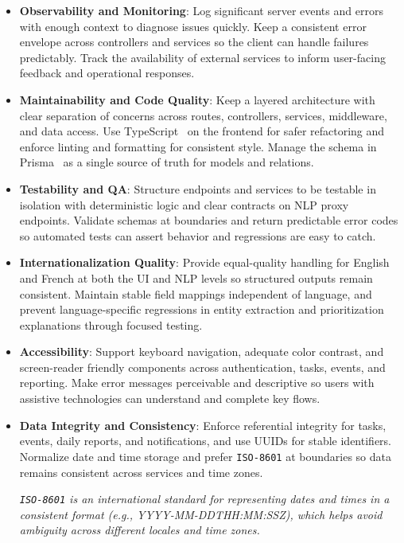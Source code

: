 \documentclass[12pt,a4paper]{article}
\begin{document}
\begin{itemize}
  \item \textbf{Observability and Monitoring}: Log significant server events and errors with enough context to diagnose issues quickly. Keep a consistent error envelope across controllers and services so the client can handle failures predictably. Track the availability of external services to inform user-facing feedback and operational responses.

  \item \textbf{Maintainability and Code Quality}: Keep a layered architecture with clear separation of concerns across routes, controllers, services, middleware, and data access. Use TypeScript~\cite{typescript} on the frontend for safer refactoring and enforce linting and formatting for consistent style. Manage the schema in Prisma~\cite{prisma} as a single source of truth for models and relations.

  \item \textbf{Testability and QA}: Structure endpoints and services to be testable in isolation with deterministic logic and clear contracts on NLP proxy endpoints. Validate schemas at boundaries and return predictable error codes so automated tests can assert behavior and regressions are easy to catch.

  \item \textbf{Internationalization Quality}: Provide equal-quality handling for English and French at both the UI and NLP levels so structured outputs remain consistent. Maintain stable field mappings independent of language, and prevent language-specific regressions in entity extraction and prioritization explanations through focused testing.

  \item \textbf{Accessibility}: Support keyboard navigation, adequate color contrast, and screen-reader friendly components across authentication, tasks, events, and reporting. Make error messages perceivable and descriptive so users with assistive technologies can understand and complete key flows.

  \item \textbf{Data Integrity and Consistency}: Enforce referential integrity for tasks, events, daily reports, and notifications, and use UUIDs for stable identifiers. Normalize date and time storage and prefer \texttt{ISO-8601} at boundaries so data remains consistent across services and time zones.
  \begin{center}
  \small\textit{\texttt{ISO-8601} is an international standard for representing dates and times in a consistent format (e.g., YYYY-MM-DDTHH:MM:SSZ), which helps avoid ambiguity across different locales and time zones.}
  \end{center}


\end{itemize}
\end{document}

